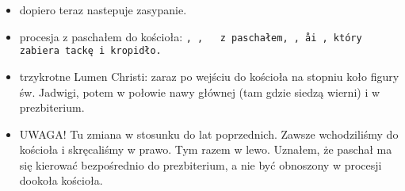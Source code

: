 \begin{itemize}
		\item dopiero teraz nastepuje zasypanie.
		\item procesja z paschałem do kościoła: \tt, , \ii~ z paschałem, \cc,
		\aa i , który zabiera tackę i kropidło.
		\item trzykrotne Lumen Christi: zaraz po wejściu do kościoła na stopniu koło figury św. Jadwigi,
		potem w połowie nawy głównej (tam gdzie siedzą wierni) i w prezbiterium.
		\item UWAGA! Tu zmiana w stosunku do lat poprzednich. Zawsze wchodziliśmy do kościoła i skręcaliśmy w prawo. Tym razem w lewo. Uznałem, że paschał ma się kierować bezpośrednio do prezbiterium, a nie być obnoszony w procesji dookoła kościoła.
	\end{itemize}
	
	